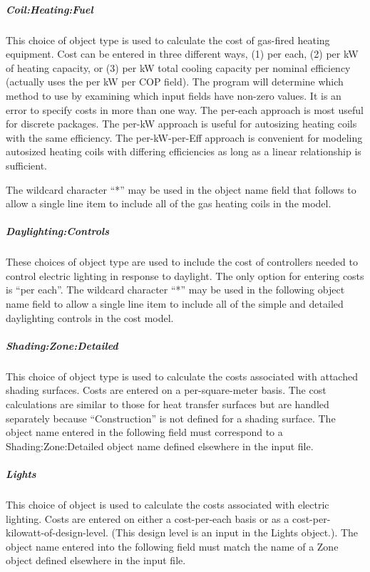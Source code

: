 \subparagraph{Coil:Heating:Fuel}\label{coilheatinggas}

This choice of object type is used to calculate the cost of gas-fired heating equipment. Cost can be entered in three different ways, (1) per each, (2) per kW of heating capacity, or (3) per kW total cooling capacity per nominal efficiency (actually uses the per kW per COP field). The program will determine which method to use by examining which input fields have non-zero values. It is an error to specify costs in more than one way. The per-each approach is most useful for discrete packages. The per-kW approach is useful for autosizing heating coils with the same efficiency. The per-kW-per-Eff approach is convenient for modeling autosized heating coils with differing efficiencies as long as a linear relationship is sufficient.

The wildcard character ``*'' may be used in the object name field that follows to allow a single line item to include all of the gas heating coils in the model.

\subparagraph{Daylighting:Controls}\label{daylightingcontrols}

These choices of object type are used to include the cost of controllers needed to control electric lighting in response to daylight. The only option for entering costs is ``per each''. The wildcard character ``*'' may be used in the following object name field to allow a single line item to include all of the simple and detailed daylighting controls in the cost model.

\subparagraph{Shading:Zone:Detailed}\label{shadingzonedetailed}

This choice of object type is used to calculate the costs associated with attached shading surfaces. Costs are entered on a per-square-meter basis. The cost calculations are similar to those for heat transfer surfaces but are handled separately because ``Construction'' is not defined for a shading surface. The object name entered in the following field must correspond to a Shading:Zone:Detailed object name defined elsewhere in the input file.

\subparagraph{Lights}\label{lights}

This choice of object is used to calculate the costs associated with electric lighting. Costs are entered on either a cost-per-each basis or as a cost-per-kilowatt-of-design-level. (This design level is an input in the Lights object.). The object name entered into the following field must match the name of a Zone object defined elsewhere in the input file.

